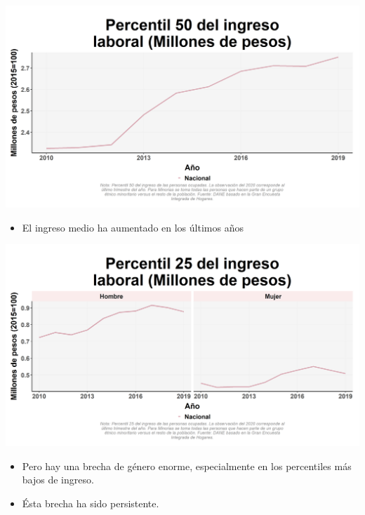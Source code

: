 \documentclass[aspectratio=169]{beamer}
\begin{document}
    \begin{slide}{3} 
                     
            \begin{imagecolumn}
                    \includegraphics[width=\columnwidth]{img/var_17_trend.png}
            \end{imagecolumn}
            \begin{textcolumn}
                \begin{itemize}
                    \item El ingreso medio ha aumentado en los últimos años
                \end{itemize}
            \end{textcolumn}

    \printcolumns
    \end{slide}

    \begin{slide}{3} 
            \begin{imagecolumn}
                \includegraphics[width=\columnwidth]{img/var_4_trend.png}
            \end{imagecolumn}
            \begin{textcolumn}
                \begin{itemize}
                    \item Pero hay una brecha de género enorme, especialmente en los percentiles más bajos de ingreso.
                    \item Ésta brecha ha sido persistente.
                \end{itemize}
            \end{textcolumn}

    \printcolumns
    \end{slide}
\end{document}
